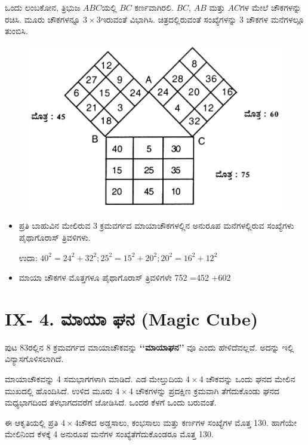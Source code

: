 ಒಂದು ಲಂಬಕೋನ, ತ್ರಿಭುಜ $ABC$ಯಲ್ಲಿ $BC$ ಕರ್ಣವಾಗಿರಲಿ. $BC$, $AB$ ಮತ್ತು $AC$ಗಳ ಮೇಲೆ ಚೌಕಗಳನ್ನು ರಚಿಸಿ. ಮೂರು ಚೌಕಗಳನ್ನೂ $3 \times 3$ಇರುವಂತೆ ವಿಭಾಗಿಸಿ. ಚಿತ್ರದಲ್ಲಿರುವಂತೆ ಸಂಖ್ಯೆಗಳನ್ನು 3 ಚೌಕಗಳ ಮನೆಗಳಲ್ಲೂ ತುಂಬಿಸಿ.
\begin{figure}[H]
\includegraphics{src/figures/chap8/fig8-10.jpg}
\end{figure}
\begin{itemize}
	\item ಪ್ರತಿ ಬಾಹುವಿನ ಮೇಲಿರುವ 3 ಕ್ರಮವರ್ಗದ ಮಾಯಾಚೌಕಗಳಲ್ಲಿನ ಅನುರೂಪ ಮನೆಗಳಲ್ಲಿರುವ ಸಂಖ್ಯೆಗಳು ಪೈಥಾಗೊರಾಸ್ ತ್ರಿವಳಿಗಳು.

	ಉದಾ: $40^2 = 24^2 +32^2 ; 25^2 =15^2 +20^2 ; 20^2 =16^2+12^2$
	\item ಮಾಯಾ ಚೌಕಗಳ ಮೊತ್ತಗಳೂ ಪೈಥಾಗೊರಾಸ್ ತ್ರಿವಳಿಗಳೇ 752 =452 +602
\end{itemize}

\section*{IX- 4. ಮಾಯಾ ಘನ (Magic Cube)}

ಪುಟ 83ರಲ್ಲಿನ 8 ಕ್ರಮವರ್ಗದ ಮಾಯಾಚೌಕವನ್ನು \textbf{‘‘ಮಾಯಾಘನ’’} ವೂ ಎಂದು ಹೇಳಿದೆವಲ್ಲವೆ. ಅದನ್ನು ಇಲ್ಲಿ ವಿನ್ಯಾಸಗೊಳಿಸಲಾಗಿದೆ.

ಮಾಯಾಚೌಕವನ್ನು 4 ಸಮಭಾಗಗಳಾಗಿ ಮಾಡಿದೆ. ಎಡ ಮೇಲ್ತುದಿಯ $4 \times 4$ ಚೌಕವನ್ನು ಒಂದು ಘನದ ಮೇಲಿನ ಮುಖದಲ್ಲಿ ಹೊಂದಿಸಿದೆ. ಉಳಿದ ಮೂರು $4 \times 4$ ಚೌಕಗಳನ್ನು ಪ್ರದಕ್ಷಿಣ ಕ್ರಮವಾಗಿ ತೆಗೆದುಕೊಂಡು ಘನದ ಮಧ್ಯಭಾಗದಿಂದ ತಳಭಾಗದವರೆಗೆ ಜೋಡಿಸಿದೆ. ಒಂದರ ಕೆಳಗೆ ಒಂದು ಬರುವಂತೆ.

ಈ ಆಕೃತಿಯಲ್ಲಿ ಪ್ರತಿ $4 \times 4$ಚೌಕದ ಅಡ್ಡಸಾಲು, ಕಂಭಸಾಲು ಮತ್ತು ಕರ್ಣಗಳ ಸಂಖ್ಯೆಗಳ ಮೊತ್ತ 130. ಹಾಗೆಯೇ ಮೇಲಿನಿಂದ ಕೆಳಕ್ಕೆ 4 ಅನುರೂಪ ಮನೆಗಳ ಸಂಖ್ಯೆತೆಗೆದುಕೊಂಡರೂ ಮೊತ್ತ 130.

